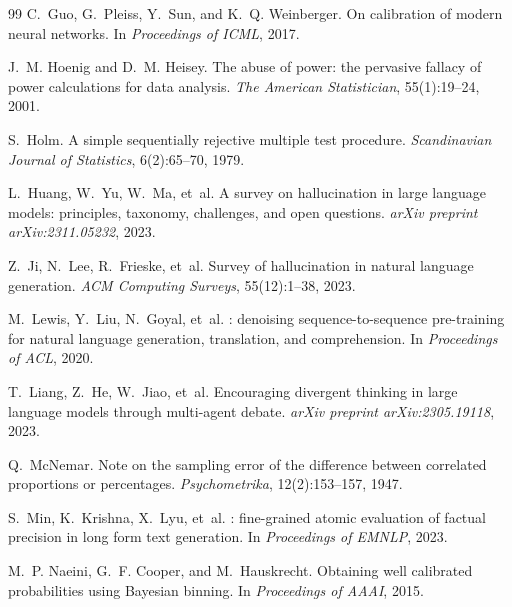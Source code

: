 \begin{thebibliography}{99}
C.~Guo, G.~Pleiss, Y.~Sun, and K.~Q. Weinberger.
\newblock On calibration of modern neural networks.
\newblock In \emph{Proceedings of ICML}, 2017.

J.~M. Hoenig and D.~M. Heisey.
\newblock The abuse of power: the pervasive fallacy of power calculations for data analysis.
\newblock \emph{The American Statistician}, 55(1):19--24, 2001.

S.~Holm.
\newblock A simple sequentially rejective multiple test procedure.
\newblock \emph{Scandinavian Journal of Statistics}, 6(2):65--70, 1979.

L.~Huang, W.~Yu, W.~Ma, et~al.
\newblock A survey on hallucination in large language models: principles, taxonomy, challenges, and open questions.
\newblock \emph{arXiv preprint arXiv:2311.05232}, 2023.

Z.~Ji, N.~Lee, R.~Frieske, et~al.
\newblock Survey of hallucination in natural language generation.
\newblock \emph{ACM Computing Surveys}, 55(12):1--38, 2023.

M.~Lewis, Y.~Liu, N.~Goyal, et~al.
: denoising sequence-to-sequence pre-training for natural language generation, translation, and comprehension.
\newblock In \emph{Proceedings of ACL}, 2020.

T.~Liang, Z.~He, W.~Jiao, et~al.
\newblock Encouraging divergent thinking in large language models through multi-agent debate.
\newblock \emph{arXiv preprint arXiv:2305.19118}, 2023.

Q.~McNemar.
\newblock Note on the sampling error of the difference between correlated proportions or percentages.
\newblock \emph{Psychometrika}, 12(2):153--157, 1947.

S.~Min, K.~Krishna, X.~Lyu, et~al.
: fine-grained atomic evaluation of factual precision in long form text generation.
\newblock In \emph{Proceedings of EMNLP}, 2023.

M.~P. Naeini, G.~F. Cooper, and M.~Hauskrecht.
\newblock Obtaining well calibrated probabilities using {B}ayesian binning.
\newblock In \emph{Proceedings of AAAI}, 2015.


\end{thebibliography}
